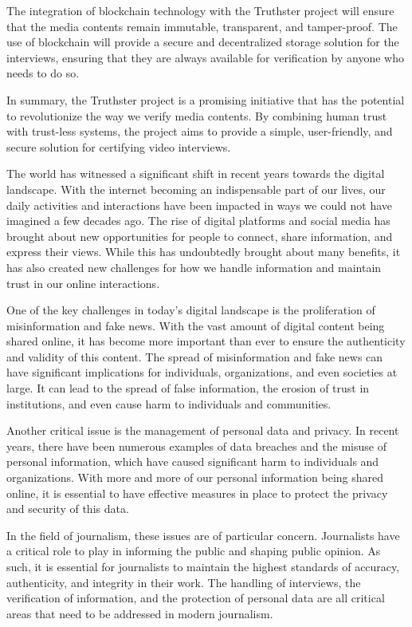 \documentclass[target=mst,aauheader=]{thud}
\begin{document}
The integration of blockchain technology with the Truthster project will ensure that the media contents remain immutable, transparent, and tamper-proof. The use of blockchain will provide a secure and decentralized storage solution for the interviews, ensuring that they are always available for verification by anyone who needs to do so.

In summary, the Truthster project is a promising initiative that has the potential to revolutionize the way we verify media contents. By combining human trust with trust-less systems, the project aims to provide a simple, user-friendly, and secure solution for certifying video interviews.

The world has witnessed a significant shift in recent years towards the digital landscape. With the internet becoming an indispensable part of our lives, our daily activities and interactions have been impacted in ways we could not have imagined a few decades ago. The rise of digital platforms and social media has brought about new opportunities for people to connect, share information, and express their views. While this has undoubtedly brought about many benefits, it has also created new challenges for how we handle information and maintain trust in our online interactions.\par
One of the key challenges in today's digital landscape is the proliferation of misinformation and fake news. With the vast amount of digital content being shared online, it has become more important than ever to ensure the authenticity and validity of this content. The spread of misinformation and fake news can have significant implications for individuals, organizations, and even societies at large. It can lead to the spread of false information, the erosion of trust in institutions, and even cause harm to individuals and communities.\par
Another critical issue is the management of personal data and privacy. In recent years, there have been numerous examples of data breaches and the misuse of personal information, which have caused significant harm to individuals and organizations. With more and more of our personal information being shared online, it is essential to have effective measures in place to protect the privacy and security of this data.\par
In the field of journalism, these issues are of particular concern. Journalists have a critical role to play in informing the public and shaping public opinion. As such, it is essential for journalists to maintain the highest standards of accuracy, authenticity, and integrity in their work. The handling of interviews, the verification of information, and the protection of personal data are all critical areas that need to be addressed in modern journalism.\par
\end{document}

